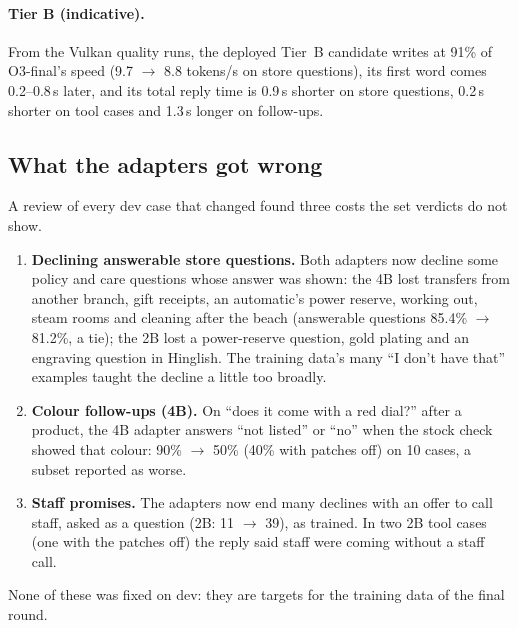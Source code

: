 \documentclass[11pt,a4paper]{article}
\begin{document}
\paragraph{Tier B (indicative).} From the Vulkan quality runs, the deployed Tier~B candidate writes at 91\% of
O3-final's speed (9.7 $\to$ 8.8 tokens/s on store questions), its first word comes 0.2--0.8\,s later, and its total reply
time is 0.9\,s shorter on store questions, 0.2\,s shorter on tool cases and 1.3\,s longer on follow-ups.

\subsection{What the adapters got wrong}\label{sec:failures}
A review of every dev case that changed found three costs the set verdicts do not show.
\begin{enumerate}
  \item \textbf{Declining answerable store questions.} Both adapters now decline some policy and care questions whose
        answer was shown: the 4B lost transfers from another branch, gift receipts, an automatic's power reserve,
        working out, steam rooms and cleaning after the beach (answerable questions 85.4\% $\to$ 81.2\%, a tie); the 2B
        lost a power-reserve question, gold plating and an engraving question in Hinglish. The training data's many
        ``I don't have that'' examples taught the decline a little too broadly.
  \item \textbf{Colour follow-ups (4B).} On ``does it come with a red dial?'' after a product, the 4B adapter answers ``not
        listed'' or ``no'' when the stock check showed that colour: 90\% $\to$ 50\% (40\% with patches off) on 10 cases,
        a subset reported as worse.
  \item \textbf{Staff promises.} The adapters now end many declines with an offer to call staff, asked as a question
        (2B: 11 $\to$ 39), as trained. In two 2B tool cases (one with the patches off) the reply said staff were coming
        without a staff call.
\end{enumerate}
None of these was fixed on dev: they are targets for the training data of the final round.
\end{document}
